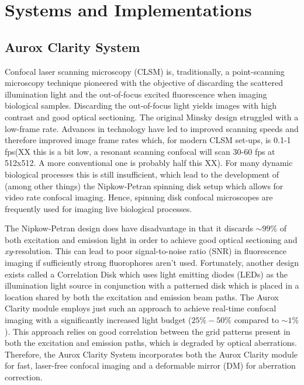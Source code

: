 \chapter{Systems and Implementations}
\label{chpt:sytems}

\section{Aurox Clarity System}
\label{sec:aurox}

Confocal laser scanning microscopy (CLSM) is, traditionally, a
point-scanning microscopy technique pioneered with the objective of
discarding the scattered illumination light and the out-of-focus
excited fluorescence when imaging biological
samples\cite{minsky1988memoir}. Discarding the out-of-focus light
yields images with high contrast and good optical
sectioning\cite{nwaneshiudu2012introduction}. The original Minsky
design struggled with a low-frame rate. Advances in technology have
led to improved scanning speeds and therefore improved image frame
rates which, for modern CLSM set-ups, is 0.1-1
fps\cite{schermelleh2010guide,xiao1988real}(XX this is a bit low, a
resonant scanning confocal will scan 30-60 fps at 512x512. A more
conventional one is probably half this XX). For many dynamic biological processes this is still insufficient, which lead to the development of (among other things) the Nipkow-Petran spinning disk setup which allows for video rate confocal imaging\cite{egger1967new,fuseler2018types,tsien1995video}. Hence, spinning disk confocal microscopes are frequently used for imaging live biological processes.

The Nipkow-Petran design does have disadvantage in that it discards $\sim99\%$ of both excitation and emission light in order to achieve good optical sectioning and \textit{xy}-resolution\cite{kino1995intermediate}. This can lead to poor signal-to-noise ratio (SNR) in fluorescence imaging if sufficiently strong fluorophores aren't used\cite{semwogerere2005confocal}. Fortunately, another design exists called a Correlation Disk which uses light emitting diodes (LEDs) as the illumination light source in conjunction with a patterned disk which is placed in a location shared by both the excitation and emission beam paths\cite{juskaitis1996efficient,wilson1996confocal,neil1997method}. The Aurox Clarity module employs just such an approach to achieve real-time confocal imaging with a significantly increased light budget ($25\%-50\%$ compared to $\sim1\%$). This approach relies on good correlation between the grid patterns present in both the excitation and emission paths, which is degraded by optical aberrations\cite{hussain2020sensorless}. Therefore, the Aurox Clarity System incorporates both the Aurox Clarity module for fast, laser-free confocal imaging and a deformable mirror (DM) for aberration correction.

